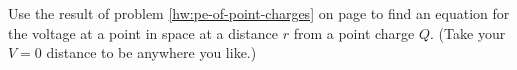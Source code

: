 Use the result of problem \ref{hw:pe-of-point-charges} on page 
        \pageref{hw:pe-of-point-charges} to find an equation
        for the voltage at a point in space at a distance $r$ from a
        point charge $Q$. (Take your $V=0$ distance to be anywhere you like.)
        \answercheck
